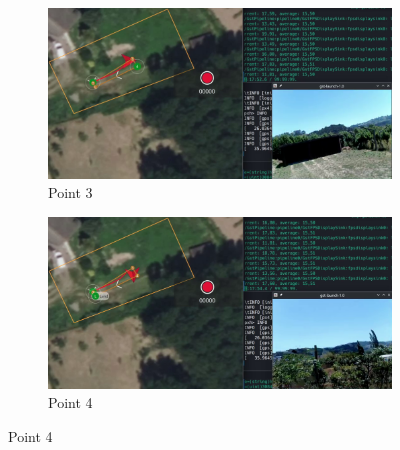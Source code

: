 \begin{figure}[!hbt]
  \begin{subfigure}[t]{0.49\textwidth}
    \centering
    \includegraphics[width=\linewidth]{./img/png/bao-fpv-3-annot} %
    \caption{Point 3}%
    \label{fig:mission-exec-case2}
  \end{subfigure}
  \hfill %
  \begin{subfigure}[t]{0.49\textwidth}
    \centering
    \includegraphics[width=\linewidth]{./img/png/bao-fpv-4-annot} 
    \caption{Point 4}%
    \label{fig:mission-exec-case3}
  \end{subfigure}
  

\end{figure}
